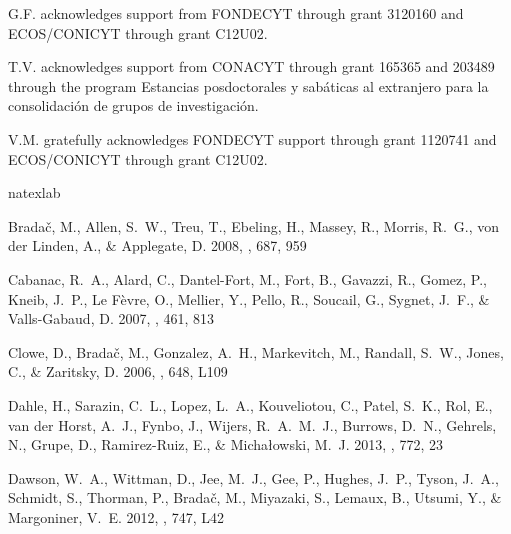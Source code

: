 \documentclass{emulateapj}
\begin{document}
G.F. acknowledges support from FONDECYT through grant 3120160 and
ECOS/CONICYT through grant C12U02.  

T.V. acknowledges support from CONACYT through grant 165365 and
203489 through the program Estancias posdoctorales y sab\'aticas al
extranjero para la consolidaci\'on de grupos de investigaci\'on.  

V.M. gratefully acknowledges FONDECYT support through grant 1120741
and ECOS/CONICYT through grant C12U02.  




% 
\begin{thebibliography}{28}
\expandafter\ifx\csname natexlab\endcsname\relax\def\natexlab#1{#1}\fi

{Brada{\v c}}, M., {Allen}, S.~W., {Treu}, T., {Ebeling}, H., {Massey}, R.,
  {Morris}, R.~G., {von der Linden}, A., \& {Applegate}, D. 2008, \apj, 687,
  959

{Cabanac}, R.~A., {Alard}, C., {Dantel-Fort}, M., {Fort}, B., {Gavazzi}, R.,
  {Gomez}, P., {Kneib}, J.~P., {Le F{\`e}vre}, O., {Mellier}, Y., {Pello}, R.,
  {Soucail}, G., {Sygnet}, J.~F., \& {Valls-Gabaud}, D. 2007, \aap, 461, 813

{Clowe}, D., {Brada{\v c}}, M., {Gonzalez}, A.~H., {Markevitch}, M., {Randall},
  S.~W., {Jones}, C., \& {Zaritsky}, D. 2006, \apjl, 648, L109

{Dahle}, H., {Sarazin}, C.~L., {Lopez}, L.~A., {Kouveliotou}, C., {Patel},
  S.~K., {Rol}, E., {van der Horst}, A.~J., {Fynbo}, J., {Wijers}, R.~A.~M.~J.,
  {Burrows}, D.~N., {Gehrels}, N., {Grupe}, D., {Ramirez-Ruiz}, E., \&
  {Micha{\l}owski}, M.~J. 2013, \apj, 772, 23

{Dawson}, W.~A., {Wittman}, D., {Jee}, M.~J., {Gee}, P., {Hughes}, J.~P.,
  {Tyson}, J.~A., {Schmidt}, S., {Thorman}, P., {Brada{\v c}}, M., {Miyazaki},
  S., {Lemaux}, B., {Utsumi}, Y., \& {Margoniner}, V.~E. 2012, \apjl, 747, L42


\end{thebibliography}
\end{document}
